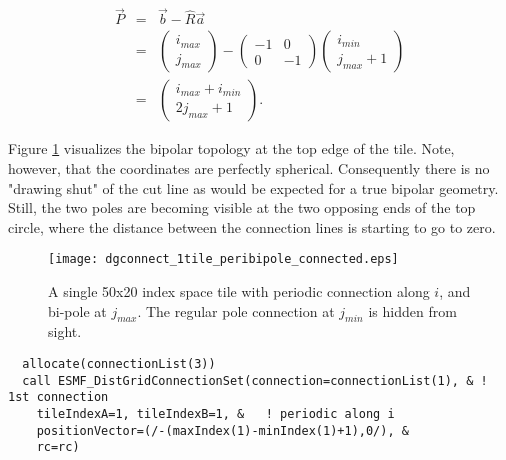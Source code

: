    \begin{eqnarray}
   \vec P & = & \vec b - \hat R \vec a \nonumber \\
          & = & \left( \begin{array}{l}
      i_{max}\\
      j_{max} \end{array} \right)
   - \left( \begin{array}{rr}
   -1 & 0 \\
   0 & -1 \end{array} \right)
   \left( \begin{array}{l}
      i_{min} \\
      j_{max}+1 \end{array} \right) \nonumber \\
          & = & \left( \begin{array}{l}
      i_{max}+i_{min}\\
      2j_{max} +1 \end{array} \right).
   \end{eqnarray}
  
   Figure \ref{fig:dgconnect_1tile_peribipole_connected} visualizes the
   bipolar topology at the top edge of the tile. Note, however, that the 
   coordinates are perfectly spherical. Consequently there is no "drawing
   shut" of the cut line as would be expected for a true bipolar geometry. 
   Still, the two poles are becoming visible at the two opposing
   ends of the top circle, where the distance between the connection lines is
   starting to go to zero.
  
   \begin{figure}[h]
     \caption{A single 50x20 index space tile with periodic connection
      along $i$, and bi-pole at $j_{max}$. The regular pole connection
      at $j_{min}$ is hidden from sight.}
     \centering
     \texttt{[image: dgconnect\_1tile\_peribipole\_connected.eps]}
     \label{fig:dgconnect_1tile_peribipole_connected}
   \end{figure} 

 \begin{verbatim}
  allocate(connectionList(3))
  call ESMF_DistGridConnectionSet(connection=connectionList(1), & ! 1st connection
    tileIndexA=1, tileIndexB=1, &   ! periodic along i
    positionVector=(/-(maxIndex(1)-minIndex(1)+1),0/), & 
    rc=rc) 
 
\end{verbatim}
 
